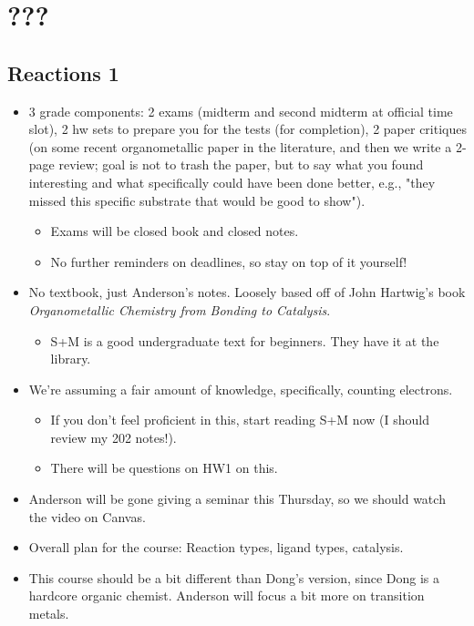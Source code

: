 \documentclass[../notes.tex]{subfiles}
\begin{document}
\chapter{???}
\section{Reactions 1}
\begin{itemize}
    \item {}3 grade components: 2 exams (midterm and second midterm at official time slot), 2 hw sets to prepare you for the tests (for completion), 2 paper critiques (on some recent organometallic paper in the literature, and then we write a 2-page review; goal is not to trash the paper, but to say what you found interesting and what specifically could have been done better, e.g., "they missed this specific substrate that would be good to show").
    \begin{itemize}
        \item Exams will be closed book and closed notes.
        \item No further reminders on deadlines, so stay on top of it yourself!
    \end{itemize}
    \item No textbook, just Anderson's notes. Loosely based off of John Hartwig's book \emph{Organometallic Chemistry from Bonding to Catalysis}.
    \begin{itemize}
        \item S+M is a good undergraduate text for beginners. They have it at the library.
    \end{itemize}
    \item We're assuming a fair amount of knowledge, specifically, counting electrons.
    \begin{itemize}
        \item If you don't feel proficient in this, start reading S+M now (I should review my 202 notes!).
        \item There will be questions on HW1 on this.
    \end{itemize}
    \item Anderson will be gone giving a seminar this Thursday, so we should watch the video on Canvas.
    \item Overall plan for the course: Reaction types, ligand types, catalysis.
    \item This course should be a bit different than Dong's version, since Dong is a hardcore organic chemist. Anderson will focus a bit more on transition metals.

\end{itemize}
\end{document}
